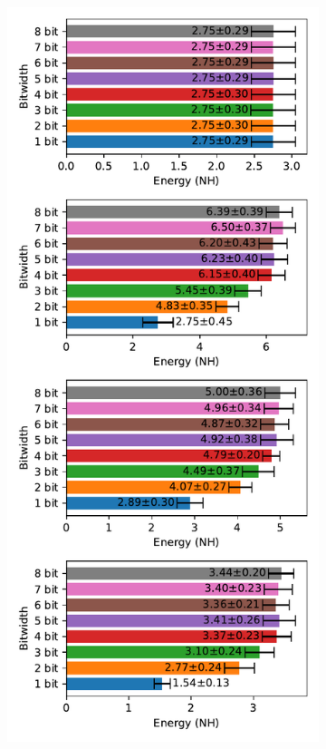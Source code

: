         \begin{figure}[H]
            \centering
            \begin{subfigure}[H]{0.495\textwidth}
                \includegraphics[width=\textwidth]{../standard/FashionMNIST/plots/fashionmnist_test_energy_nh.pdf}

\end{subfigure}
\end{figure}
